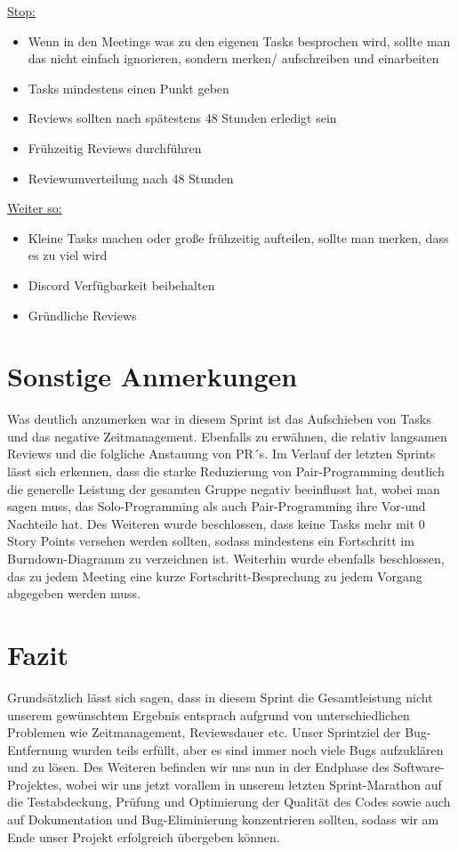 \documentclass[12pt,a4paper, oneside]{article}
\begin{document}
\underline{Stop:}

\begin{itemize}
    \item Wenn in den Meetings was zu den eigenen Tasks besprochen wird, sollte man das nicht einfach ignorieren, sondern merken/ aufschreiben und einarbeiten
    \item Tasks mindestens einen Punkt geben
    \item Reviews sollten nach spätestens 48 Stunden erledigt sein
    \item Frühzeitig Reviews durchführen
    \item Reviewumverteilung nach 48 Stunden
\end{itemize}

\underline{Weiter so:}

\begin{itemize}
    \item Kleine Tasks machen oder große frühzeitig aufteilen, sollte man merken, dass es zu viel wird
    \item Discord Verfügbarkeit beibehalten
    \item Gründliche Reviews
\end{itemize}

\newpage

\section{Sonstige Anmerkungen}

Was deutlich anzumerken war in diesem Sprint ist das Aufschieben von Tasks und das negative Zeitmanagement.
Ebenfalls zu erwähnen, die relativ langsamen Reviews und die folgliche Anstauung von PR´s.
Im Verlauf der letzten Sprints lässt sich erkennen, dass die starke Reduzierung von Pair-Programming deutlich die generelle Leistung der gesamten
Gruppe negativ beeinflusst hat, wobei man sagen muss, das Solo-Programming als auch Pair-Programming ihre Vor-und Nachteile hat.
Des Weiteren wurde beschlossen, dass keine Tasks mehr mit 0 Story Points versehen werden sollten, sodass mindestens ein Fortschritt im
Burndown-Diagramm zu verzeichnen ist. Weiterhin wurde ebenfalls beschlossen, das zu jedem Meeting eine kurze Fortschritt-Besprechung zu jedem
Vorgang abgegeben werden muss.

\section{Fazit}

Grundsätzlich lässt sich sagen, dass in diesem Sprint die Gesamtleistung nicht unserem gewünschtem Ergebnis entsprach aufgrund von unterschiedlichen
Problemen wie Zeitmanagement, Reviewsdauer etc. Unser Sprintziel der Bug-Entfernung wurden teils erfüllt, aber es sind immer noch viele Bugs
aufzuklären und zu lösen. Des Weiteren befinden wir uns nun in der Endphase des Software-Projektes, wobei wir uns jetzt vorallem in unserem letzten
Sprint-Marathon auf die Testabdeckung, Prüfung und Optimierung der Qualität des Codes sowie auch auf Dokumentation und Bug-Eliminierung konzentrieren
sollten, sodass wir am Ende unser Projekt erfolgreich übergeben können.
\end{document}
